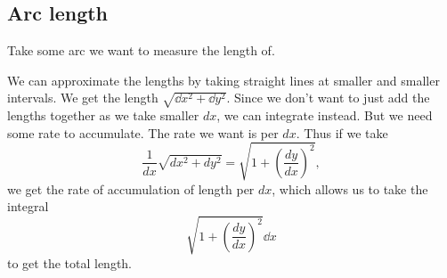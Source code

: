 \documentclass[../main.tex]{subfiles}
\begin{document}
\subsection{Arc length}

Take some arc we want to measure the length of.

\noindent


We can approximate the lengths by taking straight lines at smaller and smaller intervals.
We get the length \( \sqrt{\dd{x}^2 + \dd{y}^2} \).
Since we don't want to just add the lengths together as we take smaller \( dx \),
we can integrate instead.
But we need some rate to accumulate.
The rate we want is per \( dx \).
Thus if we take
\[ \frac{1}{dx} \sqrt{dx^2 + dy^2} = \sqrt{1 + \left(\frac{dy}{dx}\right)^2}, \]
we get the rate of accumulation of length per \( dx \),
which allows us to take the integral
\[ \sqrt{1 + \left(\frac{dy}{dx}\right)^2} \dd x \]
to get the total length.
\end{document}
